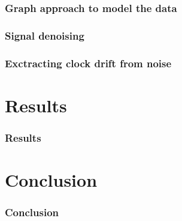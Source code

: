 \documentclass{beamer}
\begin{document}
\begin{frame}
\frametitle{Graph approach to model the data}

\end{frame}


\begin{frame}
\frametitle{Signal denoising}

\end{frame}

\begin{frame}
\frametitle{Exctracting clock drift from noise}

\end{frame}


\section{Results}
\begin{frame}
\frametitle{Results}
\end{frame}

\section{Conclusion}
 \begin{frame}
\frametitle{Conclusion}
\end{frame}
 
\end{document}
